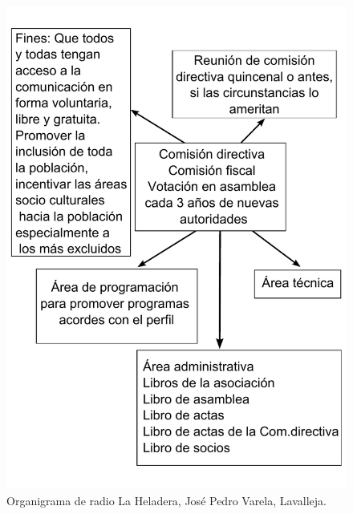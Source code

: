 \begin{figure}[htbp]
 \centering
 \includegraphics[scale=0.6]{./Cap/Organigramas/hela.pdf}
 \caption{Organigrama de radio La Heladera, José Pedro Varela, Lavalleja.}
\end{figure}

